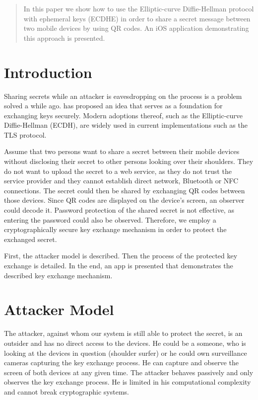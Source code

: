 \begin{abstract}
	In this paper we show how to use the Elliptic-curve Diffie-Hellman protocol with ephemeral keys (ECDHE) in order to share a secret message between two mobile devices by using QR codes.
	An iOS application demonstrating this approach is presented.
\end{abstract}


\section{Introduction}

Sharing secrets while an attacker is eavesdropping on the process is a problem solved a while ago.
\textcite{DBLP:journals/cacm/Merkle78} has proposed an idea that serves as a foundation for exchanging keys securely.
Modern adoptions thereof, such as the Elliptic-curve Diffie-Hellman (ECDH), are widely used in current implementations such as the TLS protocol.

Assume that two persons want to share a secret between their mobile devices without disclosing their secret to other persons looking over their shoulders.
They do not want to upload the secret to a web service, as they do not trust the service provider and they cannot establish direct network, Bluetooth or NFC connections.
The secret could then be shared by exchanging QR codes between those devices.
Since QR codes are displayed on the device's screen, an observer could decode it.
Password protection of the shared secret is not effective, as entering the password could also be observed.
Therefore, we employ a cryptographically secure key exchange mechanism in order to protect the exchanged secret.

First, the attacker model is described.
Then the process of the protected key exchange is detailed.
In the end, an app is presented that demonstrates the described key exchange mechanism.


\section{Attacker Model}

The attacker, against whom our system is still able to protect the secret, is an outsider and has no direct access to the devices.
He could be a someone, who is looking at the devices in question (shoulder surfer) or he could own surveillance cameras capturing the key exchange process.
He can capture and observe the screen of both devices at any given time.
The attacker behaves passively and only observes the key exchange process.
He is limited in his computational complexity and cannot break cryptographic systems.


